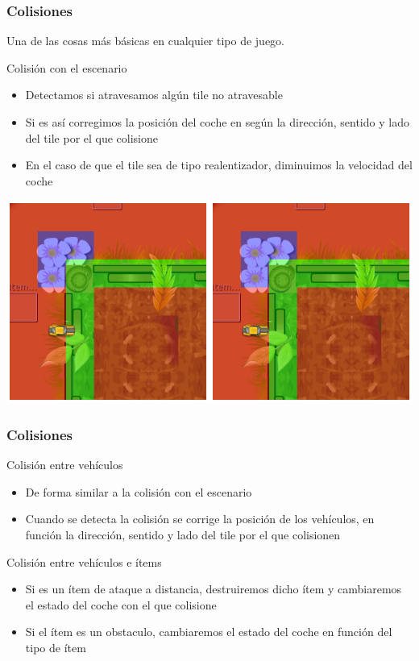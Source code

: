 \begin{frame}
    \frametitle{Colisiones}
    
    Una de las cosas más básicas en cualquier tipo de juego.

    \begin{block}{Colisión con el escenario}
        \begin{itemize}
            \item Detectamos si atravesamos algún tile no atravesable
            \item Si es así corregimos la posición del coche en según la dirección, sentido y lado del tile por
            el que colisione
            \item En el caso de que el tile sea de tipo realentizador, diminuimos la velocidad del coche
        \end{itemize}
    \end{block}

    \begin{center}
        \includegraphics[scale=0.3]{imagenes/colision1-colision2.png}
    \end{center}
\end{frame}

\begin{frame}
    \frametitle{Colisiones}
    
    \begin{block}{Colisión entre vehículos}
        \begin{itemize}
            \item De forma similar a la colisión con el escenario
            \item Cuando se detecta la colisión se corrige la posición de los vehículos, en función la dirección, 
            sentido y lado del tile por el que colisionen
        \end{itemize}
    \end{block}
    
    \begin{block}{Colisión entre vehículos e ítems}
        \begin{itemize}
            \item Si es un ítem de ataque a distancia, destruiremos dicho ítem y cambiaremos el estado del coche con el que
            colisione
            \item Si el ítem es un obstaculo, cambiaremos el estado del coche en función del tipo de ítem
        \end{itemize}
    \end{block}

\end{frame}

